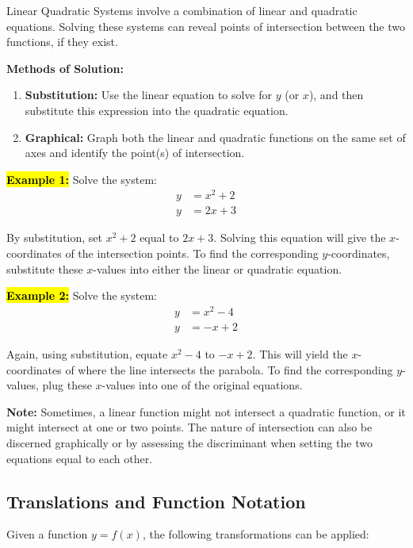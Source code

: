 \documentclass[12pt,a4paper]{article}
\begin{document}
Linear Quadratic Systems involve a combination of linear and quadratic equations. Solving these systems can reveal points of intersection between the two functions, if they exist.

\textbf{Methods of Solution:}
\begin{enumerate}
    \item \textbf{Substitution:} Use the linear equation to solve for \(y\) (or \(x\)), and then substitute this expression into the quadratic equation.
    \item \textbf{Graphical:} Graph both the linear and quadratic functions on the same set of axes and identify the point(s) of intersection.
\end{enumerate}

\textbf{\hl{Example 1:}} Solve the system:
\[
\begin{aligned}
    y &= x^2 + 2 \\
    y &= 2x + 3
\end{aligned}
\]

By substitution, set \(x^2 + 2\) equal to \(2x + 3\). Solving this equation will give the \(x\)-coordinates of the intersection points. To find the corresponding \(y\)-coordinates, substitute these \(x\)-values into either the linear or quadratic equation.

\textbf{\hl{Example 2:}} Solve the system:
\[
\begin{aligned}
    y &= x^2 - 4 \\
    y &= -x + 2
\end{aligned}
\]

Again, using substitution, equate \(x^2 - 4\) to \(-x + 2\). This will yield the \(x\)-coordinates of where the line intersects the parabola. To find the corresponding \(y\)-values, plug these \(x\)-values into one of the original equations.

\textbf{Note:} Sometimes, a linear function might not intersect a quadratic function, or it might intersect at one or two points. The nature of intersection can also be discerned graphically or by assessing the discriminant when setting the two equations equal to each other.

\subsection{Translations and Function Notation}

Given a function \( y = f(x) \), the following transformations can be applied:
\end{document}
